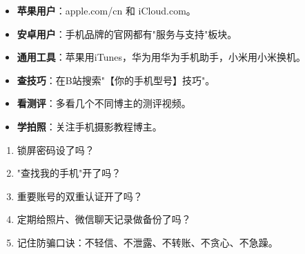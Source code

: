 

\begin{itemize}
  \item \textbf{苹果用户}：apple.com/cn 和 iCloud.com。
  \item \textbf{安卓用户}：手机品牌的官网都有"服务与支持"板块。
  \item \textbf{通用工具}：苹果用iTunes，华为用华为手机助手，小米用小米换机。
\end{itemize}


\begin{itemize}
  \item \textbf{查技巧}：在B站搜索"【你的手机型号】技巧"。
  \item \textbf{看测评}：多看几个不同博主的测评视频。
  \item \textbf{学拍照}：关注手机摄影教程博主。
\end{itemize}


\begin{enumerate}
  \item 锁屏密码设了吗？
  \item "查找我的手机"开了吗？
  \item 重要账号的双重认证开了吗？
  \item 定期给照片、微信聊天记录做备份了吗？
  \item 记住防骗口诀：不轻信、不泄露、不转账、不贪心、不急躁。
\end{enumerate}
